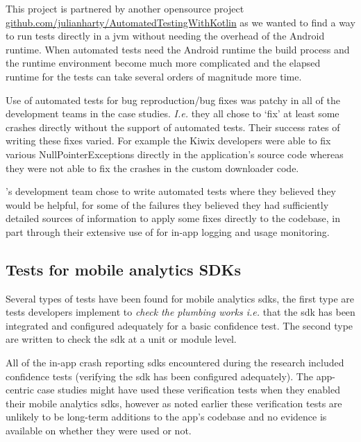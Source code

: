 This project is partnered by another opensource project \href{https://github.com/julianharty/AutomatedTestingWithKotlin}{github.com/julianharty/AutomatedTestingWithKotlin} as we wanted to find a way to run tests directly in a \gls{jvm} without needing the overhead of the Android runtime. When automated tests need the Android runtime the build process and the runtime environment become much more complicated and the elapsed runtime for the tests can take several orders of magnitude more time.

Use of automated tests for bug reproduction/bug fixes was patchy in all of the development teams in the case studies. \emph{I.e.} they all chose to `fix' at least some crashes directly without the support of automated tests. Their success rates of writing these fixes varied. For example the Kiwix developers were able to fix various NullPointerExceptions directly in the application's source code whereas they were not able to fix the crashes in the custom downloader code. 

's development team chose to write automated tests where they believed they would be helpful, for some of the failures they believed they had sufficiently detailed sources of information to apply some fixes directly to the codebase, in part through their extensive use of  for in-app logging and usage monitoring.



\subsection{Tests for mobile analytics SDKs}
Several types of tests have been found for mobile analytics \Gls{sdk}s, the first type are tests developers implement to \textit{check the plumbing works i.e.} that the \Gls{sdk} has been integrated and configured adequately for a basic confidence test. The second type are written to check the \Gls{sdk} at a unit or module level.

All of the in-app crash reporting \Gls{sdk}s encountered during the research included confidence tests (verifying the \Gls{sdk} has been configured adequately). The app-centric case studies might have used these verification tests when they enabled their mobile analytics \Gls{sdk}s, however as noted earlier these verification tests are unlikely to be long-term additions to the app's codebase and no evidence is available on whether they were used or not. 

